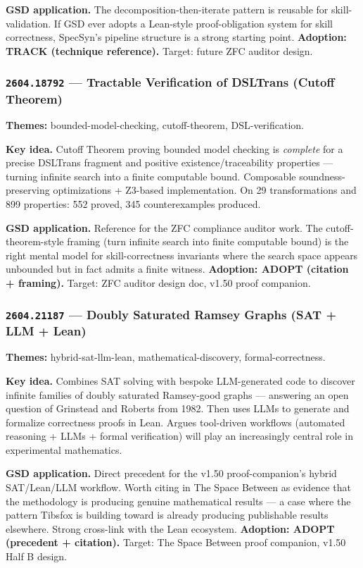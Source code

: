 \documentclass[11pt,letterpaper]{article}
\newcommand{\arxivid}[1]{\texttt{\textcolor{accent}{#1}}}
\newcommand{\paperhead}[2]{\noindent\textbf{\sffamily\textcolor{secondary}{#1}} \textemdash{} #2}
\begin{document}
\textbf{GSD application.} The decomposition-then-iterate pattern is reusable for skill-validation. If GSD ever adopts a Lean-style proof-obligation system for skill correctness, SpecSyn's pipeline structure is a strong starting point. \textbf{Adoption: TRACK (technique reference).} Target: future ZFC auditor design.

\subsubsection{\arxivid{2604.18792} --- Tractable Verification of DSLTrans (Cutoff Theorem)}

\paperhead{Themes:}{bounded-model-checking, cutoff-theorem, DSL-verification.}

\textbf{Key idea.} Cutoff Theorem proving bounded model checking is \textit{complete} for a precise DSLTrans fragment and positive existence/traceability properties --- turning infinite search into a finite computable bound. Composable soundness-preserving optimizations + Z3-based implementation. On 29 transformations and 899 properties: 552 proved, 345 counterexamples produced.

\textbf{GSD application.} Reference for the ZFC compliance auditor work. The cutoff-theorem-style framing (turn infinite search into finite computable bound) is the right mental model for skill-correctness invariants where the search space appears unbounded but in fact admits a finite witness. \textbf{Adoption: ADOPT (citation + framing).} Target: ZFC auditor design doc, v1.50 proof companion.

\subsubsection{\arxivid{2604.21187} --- Doubly Saturated Ramsey Graphs (SAT + LLM + Lean)}

\paperhead{Themes:}{hybrid-sat-llm-lean, mathematical-discovery, formal-correctness.}

\textbf{Key idea.} Combines SAT solving with bespoke LLM-generated code to discover infinite families of doubly saturated Ramsey-good graphs --- answering an open question of Grinstead and Roberts from 1982. Then uses LLMs to generate and formalize correctness proofs in Lean. Argues tool-driven workflows (automated reasoning + LLMs + formal verification) will play an increasingly central role in experimental mathematics.

\textbf{GSD application.} Direct precedent for the v1.50 proof-companion's hybrid SAT/Lean/LLM workflow. Worth citing in The Space Between as evidence that the methodology is producing genuine mathematical results --- a case where the pattern Tibsfox is building toward is already producing publishable results elsewhere. Strong cross-link with the Lean ecosystem. \textbf{Adoption: ADOPT (precedent + citation).} Target: The Space Between proof companion, v1.50 Half B design.
\end{document}
